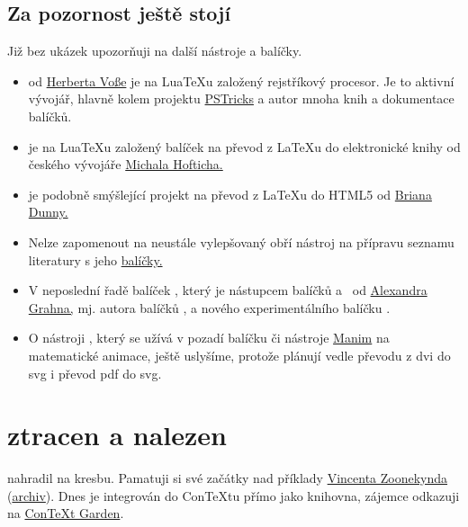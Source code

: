 \subsection{Za pozornost ještě stojí}
Již bez ukázek upozorňuji na další nástroje a balíčky.
\begin{itemize}
\itemsep=-1pt
\item {} od 
\href{https://ctan.org/author/voss}{Herberta Vo\ss e} je na Lua\TeX u založený rejstříkový procesor. Je to aktivní vývojář, hlavně kolem projektu 
\href{https://tug.org/PSTricks/main.cgi/}{PSTricks}
a autor mnoha knih a dokumentace balíčků.
\item {} je na Lua\TeX u založený balíček na převod z \LaTeX u do elektronické knihy od českého vývojáře 
\href{https://github.com/michal-h21}{Michala Hofticha.}
\item {} je podobně smýšlející projekt na převod z \LaTeX u do HTML5 od 
\href{http://bdtechconcepts.com/}{Briana Dunny.}
\item Nelze zapomenout na neustále vylepšovaný obří nástroj na přípravu seznamu literatury  s jeho 
\href{https://ctan.org/search?phrase=biblatex}{balíčky.}
\item V neposlední řadě balíček , který je nástupcem balíčků  a~\mbox{} od
\href{https://www.ctan.org/author/grahn}{Alexandra Grahna,} mj. autora balíčků ,  a nového experimentálního balíčku . 
\item O nástroji , který se užívá v pozadí balíčku  či nástroje \href{https://github.com/3b1b/manim}{Manim} na matematické animace, ještě uslyšíme, protože plánují vedle převodu z dvi do svg i převod pdf do svg.
\end{itemize}

\section{\MP{} ztracen a nalezen}

\MP{} nahradil \MF{} na kresbu. Pamatuji si své začátky nad příklady 
\href{http://zoonek.free.fr/LaTeX/Metapost/metapost.html}{Vincenta Zoonekynda} (\href{https://ctan.org/tex-archive/info/metapost/examples}{archiv}). Dnes je \MP{} integrován do Con\TeX tu přímo jako knihovna, zájemce odkazuji na 
\href{https://wiki.contextgarden.net/MetaPost}{Con\TeX t Garden}. 

